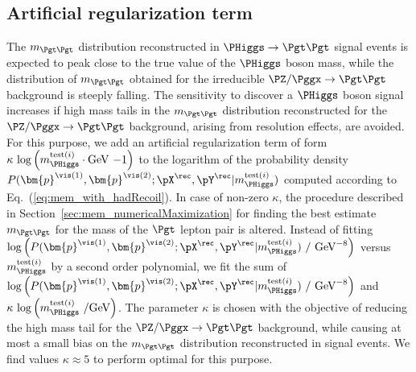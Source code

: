 \subsection{Artificial regularization term}
\label{sec:mem_logM}

The $m_{\Pgt\Pgt}$ distribution reconstructed in $\PHiggs \to \Pgt\Pgt$ signal events is expected to peak close to the true value of the $\PHiggs$ boson mass,
while the distribution of $m_{\Pgt\Pgt}$ obtained for the irreducible $\PZ/\Pggx \to \Pgt\Pgt$ background is steeply falling.
The sensitivity to discover a $\PHiggs$ boson signal increases if high mass tails in the $m_{\Pgt\Pgt}$ distribution reconstructed 
for the $\PZ/\Pggx \to \Pgt\Pgt$ background, arising from resolution effects, are avoided.
For this purpose,
we add an artificial regularization term of form 
$\kappa \, \log \left( m_{\PHiggs}^{\textrm{test}(i)} \cdot \mbox{GeV}~{-1} \right)$ 
to the logarithm of the probability density $P(\bm{p}^{\vis(1)},\bm{p}^{\vis(2)};\pX^{\rec},\pY^{\rec}|m_{\PHiggs}^{\textrm{test}(i)})$
computed according to Eq.~(\ref{eq:mem_with_hadRecoil}).
In case of non-zero $\kappa$,
the procedure described in Section~\ref{sec:mem_numericalMaximization} for finding the best estimate $m_{\Pgt\Pgt}$ for the mass of the $\Pgt$ lepton pair is altered.
Instead of fitting 
$\log \left( P(\bm{p}^{\vis(1)},\bm{p}^{\vis(2)};\pX^{\rec},\pY^{\rec}|m_{\PHiggs}^{\textrm{test}(i)})~/\mbox{~GeV}^{-8} \right)$ 
versus $m_{\PHiggs}^{\textrm{test}(i)}$ by a second order polynomial,
we fit the sum of $\log \left( P(\bm{p}^{\vis(1)},\bm{p}^{\vis(2)};\pX^{\rec},\pY^{\rec}|m_{\PHiggs}^{\textrm{test}(i)})~/\mbox{~GeV}^{-8} \right)$
and $\kappa \, \log \left( m_{\PHiggs}^{\textrm{test}(i)}~/\mbox{GeV} \right)$.
The parameter $\kappa$ is chosen with the objective of reducing the high mass tail for the $\PZ/\Pggx \to \Pgt\Pgt$ background,
while causing at most a small bias on the $m_{\Pgt\Pgt}$ distribution reconstructed in signal events.
We find values $\kappa \approx 5$ to perform optimal for this purpose.
